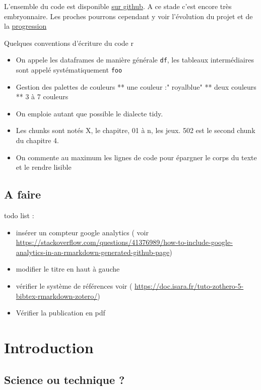 \documentclass[
]{book}
\providecommand{\tightlist}{%
  \setlength{\itemsep}{0pt}\setlength{\parskip}{0pt}}
\begin{document}
L'ensemble du code est disponible \href{https://github.com/BenaventC/NLPBook}{sur github}. A ce stade c'est encore très embryonnaire. Les proches pourrons cependant y voir l'évolution du projet et de la \href{https://benaventc.github.io/NLPBook/}{progression}

Quelques conventions d'écriture du code r

\begin{itemize}
\tightlist
\item
  On appele les dataframes de manière générale \texttt{df}, les tableaux intermédiaires sont appelé systématiquement \texttt{foo}
\item
  Gestion des palettes de couleurs
  ** une couleur :" royalblue"
  ** deux couleurs
  ** 3 à 7 couleurs
\item
  On emploie autant que possible le dialecte tidy.
\item
  Les chunks sont notés X, le chapitre, 01 à n, les jeux. 502 est le second chunk du chapitre 4.
\item
  On commente au maximum les lignes de code pour épargner le corps du texte et le rendre lisible
\end{itemize}

\hypertarget{a-faire}{%
\section{A faire}\label{a-faire}}

todo list :

\begin{itemize}
\tightlist
\item
  insérer un compteur google analytics ( voir \url{https://stackoverflow.com/questions/41376989/how-to-include-google-analytics-in-an-rmarkdown-generated-github-page})
\item
  modifier le titre en haut à gauche
\item
  vérifier le système de références voir ( \url{https://doc.isara.fr/tuto-zothero-5-bibtex-rmarkdown-zotero/})
\item
  Vérifier la publication en pdf
\end{itemize}

\hypertarget{intro}{%
\chapter{Introduction}\label{intro}}

\hypertarget{science-ou-technique}{%
\section{Science ou technique ?}\label{science-ou-technique}}
\end{document}
